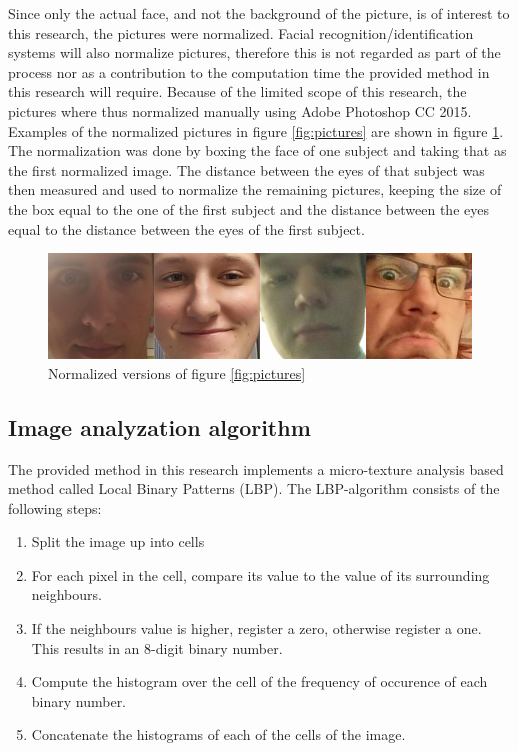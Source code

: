 \documentclass{sig-alternate-br}
\begin{document}
Since only the actual face, and not the background of the picture, is of interest to this research, the pictures were normalized. Facial recognition/identification systems will also normalize pictures, therefore this is not regarded as part of the process nor as a contribution to the computation time the provided method in this research will require. Because of the limited scope of this research, the pictures where thus normalized manually using Adobe Photoshop CC 2015. Examples of the normalized pictures in figure \ref{fig:pictures} are shown in figure \ref{fig:normalized}. The normalization was done by boxing the face of one subject and taking that as the first normalized image. The distance between the eyes of that subject was then measured and used to normalize the remaining pictures, keeping the size of the box equal to the one of the first subject and the distance between the eyes equal to the distance between the eyes of the first subject.

\begin{figure}[h]
	\includegraphics[scale=0.2]{normalized}
	\caption{Normalized versions of figure \ref{fig:pictures}}
	\label{fig:normalized}
\end{figure}


\subsection{Image analyzation algorithm} \label{lbp}
The provided method in this research implements a micro-texture analysis based method called Local Binary Patterns (LBP). The LBP-algorithm consists of the following steps:
\begin{enumerate}
	\item Split the image up into cells
	\item For each pixel in the cell, compare its value to the value of its surrounding neighbours.
	\item If the neighbours value is higher, register a zero, otherwise register a one. This results in an 8-digit binary number.
	\item Compute the histogram over the cell of the frequency of occurence of each binary number.
	\item Concatenate the histograms of each of the cells of the image.
\end{enumerate}
\end{document}
